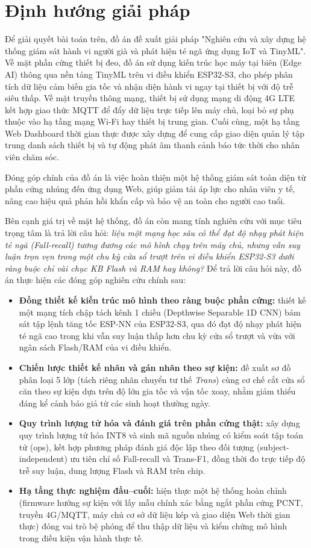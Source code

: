 \documentclass[../DoAn.tex]{subfiles}
\begin{document}
\section{Định hướng giải pháp}
\label{section:1.3}
Để giải quyết bài toán trên, đồ án đề xuất giải pháp "Nghiên cứu và xây dựng hệ thống giám sát hành vi người già và phát hiện té ngã ứng dụng IoT và TinyML". 
Về mặt phần cứng thiết bị đeo, đồ án sử dụng kiến trúc học máy tại biên (Edge AI) thông qua nền tảng TinyML trên vi điều khiển ESP32-S3, cho phép phân tích dữ liệu cảm biến gia tốc và nhận diện hành vi ngay tại thiết bị với độ trễ siêu thấp. Về mặt truyền thông mạng, thiết bị sử dụng mạng di động 4G LTE kết hợp giao thức MQTT để đẩy dữ liệu trực tiếp lên máy chủ, loại bỏ sự phụ thuộc vào hạ tầng mạng Wi-Fi hay thiết bị trung gian. Cuối cùng, một hạ tầng Web Dashboard thời gian thực được xây dựng để cung cấp giao diện quản lý tập trung danh sách thiết bị và tự động phát âm thanh cảnh báo tức thời cho nhân viên chăm sóc.

Đóng góp chính của đồ án là việc hoàn thiện một hệ thống giám sát toàn diện từ phần cứng nhúng đến ứng dụng Web, giúp giảm tải áp lực cho nhân viên y tế, nâng cao hiệu quả phản hồi khẩn cấp và bảo vệ an toàn cho người cao tuổi.

Bên cạnh giá trị về mặt hệ thống, đồ án còn mang tính nghiên cứu với mục tiêu trọng tâm là trả lời câu hỏi: \textit{liệu một mạng học sâu có thể đạt độ nhạy phát hiện té ngã (Fall-recall) tương đương các mô hình chạy trên máy chủ, nhưng vẫn suy luận trọn vẹn trong một chu kỳ cửa sổ trượt trên vi điều khiển ESP32-S3 dưới ràng buộc chỉ vài chục KB Flash và RAM hay không?} Để trả lời câu hỏi này, đồ án thực hiện các đóng góp nghiên cứu chính sau:
\begin{itemize}
    \item \textbf{Đồng thiết kế kiến trúc mô hình theo ràng buộc phần cứng:} thiết kế một mạng tích chập tách kênh 1 chiều (Depthwise Separable 1D CNN) bám sát tập lệnh tăng tốc ESP-NN của ESP32-S3, qua đó đạt độ nhạy phát hiện té ngã cao trong khi vẫn suy luận thấp hơn chu kỳ cửa sổ trượt và vừa với ngân sách Flash/RAM của vi điều khiển.
    \item \textbf{Chiến lược thiết kế nhãn và gán nhãn theo sự kiện:} đề xuất sơ đồ phân loại 5 lớp (tách riêng nhãn chuyển tư thế \textit{Trans}) cùng cơ chế cắt cửa sổ căn theo sự kiện dựa trên độ lớn gia tốc và vận tốc xoay, nhằm giảm thiểu đáng kể cảnh báo giả từ các sinh hoạt thường ngày.
    \item \textbf{Quy trình lượng tử hóa và đánh giá trên phần cứng thật:} xây dựng quy trình lượng tử hóa INT8 và sinh mã nguồn nhúng có kiểm soát tập toán tử (ops), kết hợp phương pháp đánh giá độc lập theo đối tượng (subject-independent) ưu tiên chỉ số Fall-recall và Trans-F1, đồng thời đo trực tiếp độ trễ suy luận, dung lượng Flash và RAM trên chip.
    \item \textbf{Hạ tầng thực nghiệm đầu--cuối:} hiện thực một hệ thống hoàn chỉnh (firmware hướng sự kiện với lấy mẫu chính xác bằng ngắt phần cứng PCNT, truyền 4G/MQTT, máy chủ cơ sở dữ liệu kép và giao diện Web thời gian thực) đóng vai trò bệ phóng để thu thập dữ liệu và kiểm chứng mô hình trong điều kiện vận hành thực tế.
\end{itemize}
\end{document}
